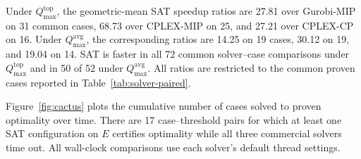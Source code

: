 \documentclass[]{interact}
\theoremstyle{plain}
\theoremstyle{definition}
\theoremstyle{remark}
\begin{document}
Under $Q_{\max}^{\mathrm{top}}$, the geometric-mean SAT speedup ratios are 27.81 over Gurobi-MIP on 31 common cases, 68.73 over CPLEX-MIP on 25, and 27.21 over CPLEX-CP on 16. Under $Q_{\max}^{\mathrm{avg}}$, the corresponding ratios are 14.25 on 19 cases, 30.12 on 19, and 19.04 on 14. SAT is faster in all 72 common solver--case comparisons under $Q_{\max}^{\mathrm{top}}$ and in 50 of 52 under $Q_{\max}^{\mathrm{avg}}$. All ratios are restricted to the common proven cases reported in Table~\ref{tab:solver-paired}.

Figure~\ref{fig:cactus} plots the cumulative number of cases solved to proven optimality over time. There are 17 case--threshold pairs for which at least one SAT configuration on $E$ certifies optimality while all three commercial solvers time out. All wall-clock comparisons use each solver's default thread settings.
\end{document}
